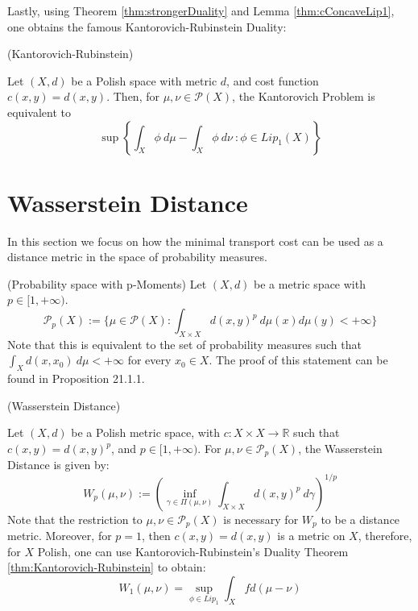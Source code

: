 Lastly, using Theorem
\ref{thm:strongerDuality} and Lemma \ref{thm:cConcaveLip1}, one obtains the famous
Kantorovich-Rubinstein Duality:

\begin{theorem}(Kantorovich-Rubinstein)

  Let $(X,d)$ be a Polish space with metric $d$, and cost function $c(x,y) = d(x,y)$.
  Then, for $\mu, \nu \in \mathcal P(X)$, the Kantorovich Problem
  is equivalent to
  \begin{equation}
      \sup \left \{
      \int_X \phi \ d\mu - \int_X \phi \ d\nu \ :
      \phi \in Lip_1(X)
      \right \}
  \end{equation}
  \label{thm:Kantorovich-Rubinstein}
\end{theorem}

\section{Wasserstein Distance}

In this section we focus on how the minimal transport cost can be used as a distance metric
in the space of probability measures.

\begin{definition}(Probability space with p-Moments)
  Let $(X,d)$ be a metric space with $ p \in [1,+\infty)$.
  \begin{equation}
    \mathcal P_p(X) := \{
         \mu \in \mathcal P(X): \int_{X \times X} d(x,y)^p \ d \mu(x) d \mu(y) < +\infty
      \}
  \label{eq:Pp}
  \end{equation}
  Note that this is equivalent to the set of probability measures such that $\int_X d(x,x_0) \ d\mu<+\infty$
  for every $x_0 \in X$. The proof of this statement can be found
  in \citet{garling2018analysis} Proposition 21.1.1.
\end{definition}

\begin{definition}(Wasserstein Distance)

  Let $(X,d)$ be a Polish metric space, with $c:X \times X \to \mathbb R$ such that $c(x,y)=d(x,y)^p$, and
  $p \in [1,+\infty)$.
  For $\mu,\nu \in \mathcal P_p(X)$, the Wasserstein Distance is given by:
  \begin{equation}
    W_p(\mu,\nu) :=
    \left(
    \inf_{\gamma \in \Pi(\mu,\nu)}
    \int_{X \times X} d(x,y)^p \ d\gamma
    \right)^{1/p}
    \label{def:Wasserstein}
  \end{equation}
  Note that the restriction to $\mu,\nu \in \mathcal P_p(X)$ is necessary for $W_p$ to be a distance metric.
  Moreover, for $p=1$, then $c(x,y) = d(x,y)$ is a metric on $X$, therefore, for $X$ Polish, one can
  use Kantorovich-Rubinstein's Duality Theorem \ref{thm:Kantorovich-Rubinstein} to obtain:
  \begin{equation}
    W_1(\mu,\nu) =
    \sup_{\phi \in Lip_1} \int_X f d (\mu - \nu)
  \end{equation}
\end{definition}

